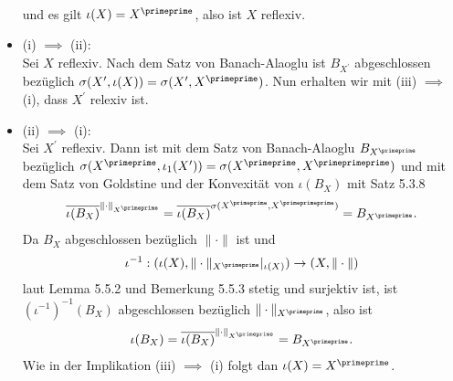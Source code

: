 \begin{solution}
\begin{itemize}
\begin{align*}
  \end{align*}
  und es gilt $\iota(X) = X^{\primeprime}$, also ist $X$ reflexiv.
  \item (i) $\implies$ (ii): \\
  Sei $X$ reflexiv. Nach dem Satz von Banach-Alaoglu ist $B_{X^{\prime}}$ abgeschlossen
  bezüglich $\sigma(X^{\prime}, \iota(X)) = \sigma(X^{\prime},X^{\primeprime})$.
  Nun erhalten wir mit (iii) $\implies$ (i), dass $X^{\prime}$ relexiv ist.
  \item (ii) $\implies$ (i): \\
  Sei $X^{\prime}$ reflexiv. Dann ist mit dem Satz von Banach-Alaoglu $B_{X^{\primeprime}}$
  bezüglich $\sigma(X^{\primeprime}, \iota_1(X^{\prime})) = \sigma(X^{\primeprime}, X^{\primeprimeprime})$
  und mit dem Satz von Goldstine und der Konvexität von $\iota(B_X)$ mit Satz 5.3.8
  \begin{align*}
    \overline{\iota(B_X)}^{\|\cdot\|_{X^{\primeprime}}}
    = \overline{\iota(B_X)}^{\sigma(X^{\primeprime},X^{\primeprimeprime})} = B_{X^{\primeprime}}.
  \end{align*}
  Da $B_X$ abgeschlossen bezüglich $\|\cdot\|$ ist und
  \begin{align*}
    \iota^{-1}: (\iota(X), \|\cdot\|_{X^{\primeprime}}|_{\iota(X)}) \to (X,\|\cdot\|)
  \end{align*}
  laut Lemma 5.5.2 und Bemerkung 5.5.3
  stetig und surjektiv ist, ist $(\iota^{-1})^{-1}(B_X)$ abgeschlossen bezüglich $\|\cdot\|_{X^{\primeprime}}$,
  also ist
  \begin{align*}
    \iota(B_X) = \overline{\iota(B_X)}^{\|\cdot\|_{X^{\primeprime}}} = B_{X^{\primeprime}}.
  \end{align*}
  Wie in der Implikation (iii) $\implies$ (i) folgt dan $\iota(X) = X^{\primeprime}$.
 \end{itemize}
\end{solution}
